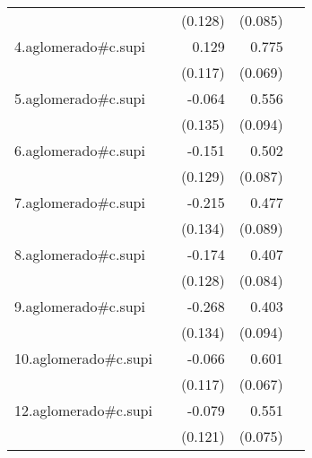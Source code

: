 {\begin{longtable}{l*{4}{D{.}{.}{-1}}}
            &                     &     (0.128)         &     (0.085)         &                     \\
\addlinespace
4.aglomerado#c.supi&                     &       0.129         &       0.775\sym{***}&                     \\
            &                     &     (0.117)         &     (0.069)         &                     \\
\addlinespace
5.aglomerado#c.supi&                     &      -0.064         &       0.556\sym{***}&                     \\
            &                     &     (0.135)         &     (0.094)         &                     \\
\addlinespace
6.aglomerado#c.supi&                     &      -0.151         &       0.502\sym{***}&                     \\
            &                     &     (0.129)         &     (0.087)         &                     \\
\addlinespace
7.aglomerado#c.supi&                     &      -0.215         &       0.477\sym{***}&                     \\
            &                     &     (0.134)         &     (0.089)         &                     \\
\addlinespace
8.aglomerado#c.supi&                     &      -0.174         &       0.407\sym{***}&                     \\
            &                     &     (0.128)         &     (0.084)         &                     \\
\addlinespace
9.aglomerado#c.supi&                     &      -0.268\sym{*}  &       0.403\sym{***}&                     \\
            &                     &     (0.134)         &     (0.094)         &                     \\
\addlinespace
10.aglomerado#c.supi&                     &      -0.066         &       0.601\sym{***}&                     \\
            &                     &     (0.117)         &     (0.067)         &                     \\
\addlinespace
12.aglomerado#c.supi&                     &      -0.079         &       0.551\sym{***}&                     \\
            &                     &     (0.121)         &     (0.075)         &                     \\

\end{longtable}}
